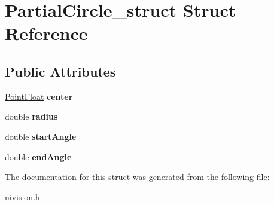 \hypertarget{structPartialCircle__struct}{
\section{PartialCircle\_\-struct Struct Reference}
\label{structPartialCircle__struct}
}
\subsection*{Public Attributes}
\begin{DoxyCompactItemize}
\item 
\hypertarget{structPartialCircle__struct_adf734585c7b8b429e069dd92deee24ee}{
\hyperlink{structPointFloat__struct}{PointFloat} {\bfseries center}}
\label{structPartialCircle__struct_adf734585c7b8b429e069dd92deee24ee}

\item 
\hypertarget{structPartialCircle__struct_a49ad22585c4272961cb398832416b48f}{
double {\bfseries radius}}
\label{structPartialCircle__struct_a49ad22585c4272961cb398832416b48f}

\item 
\hypertarget{structPartialCircle__struct_aa5e522589d321782a08658733c1f0b1f}{
double {\bfseries startAngle}}
\label{structPartialCircle__struct_aa5e522589d321782a08658733c1f0b1f}

\item 
\hypertarget{structPartialCircle__struct_a88147d74292bb63565ed306811f97827}{
double {\bfseries endAngle}}
\label{structPartialCircle__struct_a88147d74292bb63565ed306811f97827}

\end{DoxyCompactItemize}


The documentation for this struct was generated from the following file:\begin{DoxyCompactItemize}
\item 
nivision.h\end{DoxyCompactItemize}
